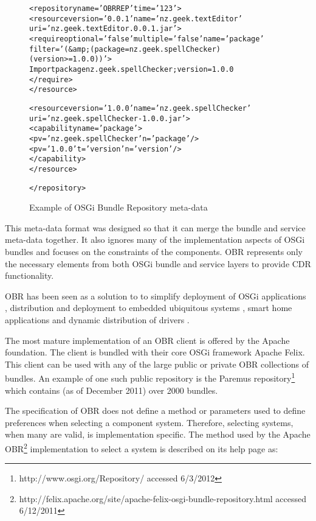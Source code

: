 \begin{figure}[htp]
\begin{center}
\begin{framed}
\begin{alltt}
<repository name='OBR REP' time='123'> 
 <resource version='0.0.1' name='nz.geek.textEditor' 
 uri='nz.geek.textEditor.0.0.1.jar'> 
  <require optional='false'  multiple='false'  name='package' 
    filter='(&amp;(package=nz.geek.spellChecker)(version>=1.0.0))'> 
   Import package nz.geek.spellChecker ;version=1.0.0 
  </require> 
 </resource> 

 <resource version='1.0.0' name='nz.geek.spellChecker' 
 uri='nz.geek.spellChecker-1.0.0.jar'> 
  <capability name='package'> 
    <p v='nz.geek.spellChecker' n='package'/> 
    <p v='1.0.0' t='version' n='version'/> 
  </capability> 
 </resource> 

</repository>
\end{alltt}
\end{framed}
  \caption{Example of OSGi Bundle Repository meta-data}
  \label{obrmetadata}
\end{center}
\end{figure}

This meta-data format was designed so that it can merge the bundle and service meta-data together.
It also ignores many of the implementation aspects of OSGi bundles and focuses on the constraints of the components.
OBR represents only the necessary elements from both OSGi bundle and service layers to provide CDR functionality. 

OBR has been seen as a solution to to simplify deployment of OSGi applications \citep{Jung2007}, 
distribution and deployment to embedded ubiquitous systems \citep{Jung2006}, 
smart home applications \citep{Gouin-Vallerand2007} and 
dynamic distribution of drivers \citep{Kriens2008}. 

The most mature implementation of an OBR client is offered by the Apache foundation.
The client is bundled with their core OSGi framework Apache Felix. 
This client can be used with any of the large public or private OBR collections of bundles.
An example of one such public repository is the Paremus repository\footnote{http://www.osgi.org/Repository/ accessed 6/3/2012} which contains (as of December 2011) over 2000 bundles.

The specification of OBR does not define a method or parameters used to define preferences when selecting a component system.
Therefore, selecting systems, when many are valid, is implementation specific.
The method used by the Apache OBR\footnote{http://felix.apache.org/site/apache-felix-osgi-bundle-repository.html accessed 6/12/2011} implementation 
to select a system is described on its help page as:


